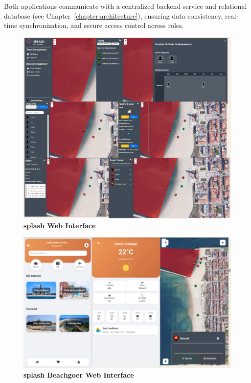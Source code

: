 Both applications communicate with a centralized backend service and relational database (see Chapter~\ref{chapter:architecture}), ensuring data consistency, real-time synchronization, and secure access control across roles.

\begin{figure}[H]
    \centering
    \includegraphics[width=15cm]{figs/pc.png}
    \caption{\textbf{\ac{splash} Web Interface} }
    \label{fig:splashwebinerface}
\end{figure}

\begin{figure}[H]
    \centering
    \includegraphics[width=15cm]{figs/mobile.png}
    \caption{\textbf{\ac{splash} Beachgoer Web Interface} }
    \label{fig:splashwebinerface}
\end{figure}


